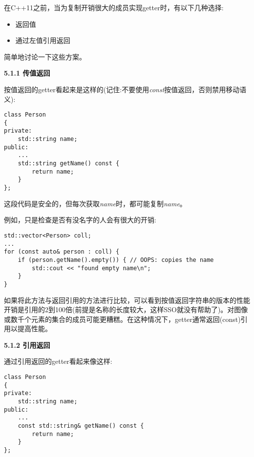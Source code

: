 在C++11之前，当为复制开销很大的成员实现getter时，有以下几种选择:\par

\begin{itemize}
	\item 返回值
	\item 通过左值引用返回
\end{itemize}

简单地讨论一下这些方案。\par

\hspace*{\fill} \par %
\textbf{5.1.1 传值返回}

按值返回的getter看起来是这样的(记住:不要使用\textit{const}按值返回，否则禁用移动语义):\par

\begin{lstlisting}[caption={}]
class Person
{
private:
	std::string name;
public:
	...
	std::string getName() const {
		return name;
	}
};
\end{lstlisting}

这段代码是安全的，但每次获取\textit{name}时，都可能复制\textit{name}。\par

例如，只是检查是否有没名字的人会有很大的开销:\par

\begin{lstlisting}[caption={}]
std::vector<Person> coll;
...
for (const auto& person : coll) {
	if (person.getName().empty()) { // OOPS: copies the name
		std::cout << "found empty name\n";
	}
}
\end{lstlisting}

如果将此方法与返回引用的方法进行比较，可以看到按值返回字符串的版本的性能开销是引用的2到100倍(前提是名称的长度较大，这样SSO就没有帮助了)。对图像或数千个元素的集合的成员可能更糟糕。在这种情况下，getter通常返回(const)引用以提高性能。\par

\hspace*{\fill} \par %
\textbf{5.1.2 引用返回}

通过引用返回的getter看起来像这样:\par

\begin{lstlisting}[caption={}]
class Person
{
private:
	std::string name;
public:
	...
	const std::string& getName() const {
		return name;
	}
};
\end{lstlisting}

